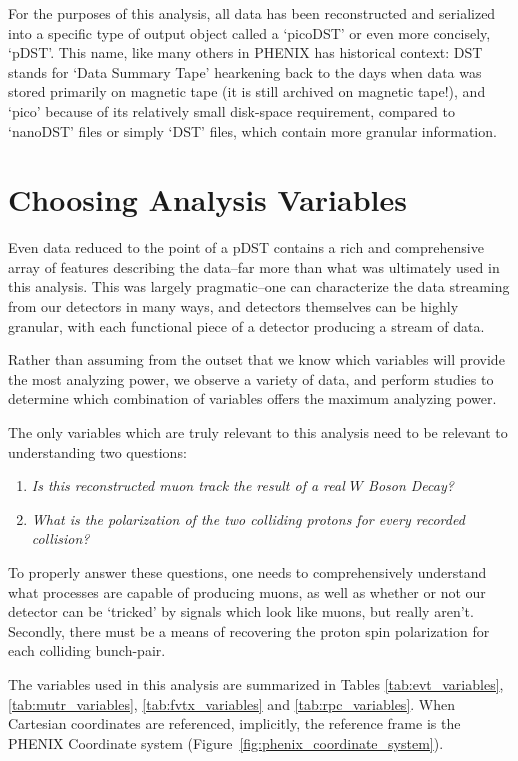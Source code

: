 For the purposes of this analysis, all data has been reconstructed and
serialized into a specific type of output object called a `picoDST' or even more
concisely, `pDST'. This name, like many others in PHENIX has historical context:
DST stands for `Data Summary Tape' hearkening back to the days when data was
stored primarily on magnetic tape (it is still archived on magnetic tape!), and
`pico' because of its relatively small disk-space requirement, compared to
`nanoDST' files or simply `DST' files, which contain more granular information.

\section{Choosing Analysis Variables}


Even data reduced to the point of a pDST contains a rich and comprehensive array
of features describing the data--far more than what was ultimately used in this
analysis.  This was largely pragmatic--one can characterize the data streaming
from our detectors in many ways, and detectors themselves can be highly
granular, with each functional piece of a detector producing a stream of data.

Rather than assuming from the outset that we know which variables will provide
the most analyzing power, we observe a variety of data, and perform studies to
determine which combination of variables offers the maximum analyzing power.


The only variables which are truly relevant to this analysis need to be relevant
to understanding two questions:

\begin{enumerate}
  \item \textit{Is this reconstructed muon track the result of a real $W$ Boson Decay?}
  \item \textit{What is the polarization of the two colliding protons for every recorded collision?}
\end{enumerate}

{\noindent}To properly answer these questions, one needs to comprehensively
understand what processes are capable of producing muons, as well as whether or
not our detector can be `tricked' by signals which look like muons, but really
aren't.  Secondly, there must be a means of recovering the proton spin
polarization for each colliding bunch-pair.

The variables used in this analysis are summarized in Tables
\ref{tab:evt_variables},\ref{tab:mutr_variables}, \ref{tab:fvtx_variables} and
\ref{tab:rpc_variables}. When Cartesian coordinates are referenced, implicitly,
the reference frame is the PHENIX Coordinate system
(Figure~\ref{fig:phenix_coordinate_system}).

